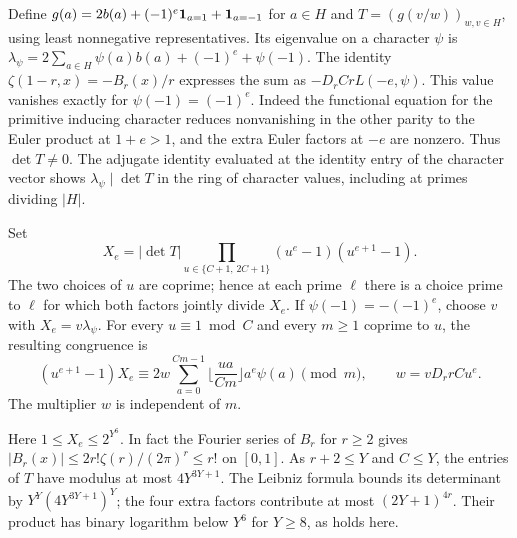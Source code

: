 Define $g(a)=2b(a)+(-1)^e{\bf1}_{a=1}+{\bf1}_{a=-1}$ for $a\in H$
and $T=(g(v/w))_{w,v\in H}$, using least nonnegative representatives.
Its eigenvalue on a character $\psi$ is
$\lambda_\psi=2\sum_{a\in H}\psi(a)b(a)+(-1)^e+\psi(-1)$.
The identity $\zeta(1-r,x)=-B_r(x)/r$ expresses the sum as
$-D_r C r L(-e,\psi)$. This value vanishes exactly for
$\psi(-1)=(-1)^e$. Indeed the functional equation for the primitive
inducing character reduces nonvanishing in the other parity to the
Euler product at $1+e>1$, and the extra Euler factors at $-e$ are nonzero.
Thus $\det T\ne0$. The adjugate identity evaluated at the identity
entry of the character vector shows $\lambda_\psi\mid\det T$ in the
ring of character values, including at primes dividing $|H|$.

Set
\[
 X_e=|\det T|\prod_{u\in\{C+1,\,2C+1\}}
              (u^e-1)(u^{e+1}-1).
\]
The two choices of $u$ are coprime; hence at each prime $\ell$ there
is a choice prime to $\ell$ for which both factors jointly divide $X_e$.
If $\psi(-1)=-(-1)^e$, choose $v$ with $X_e=v\lambda_\psi$.
For every $u\equiv1\bmod C$ and every $m\ge1$ coprime to $u$, the resulting congruence is
\[
 (u^{e+1}-1) X_e\equiv
 2w\sum_{a=0}^{Cm-1}\Big\lfloor\frac{ua}{Cm}\Big\rfloor a^e\psi(a)
 \pmod m,\qquad w=vD_r r C u^e .
\]
The multiplier $w$ is independent of $m$.

Here $1\le X_e\le 2^{Y^6}$. In fact the Fourier series of $B_r$ for
$r\ge2$ gives $|B_r(x)|\le 2r!\zeta(r)/(2\pi)^r\le r!$ on $[0,1]$.
As $r+2\le Y$ and $C\le Y$, the entries of $T$ have modulus at most
$4Y^{3Y+1}$. The Leibniz formula bounds its determinant by
$Y^Y(4Y^{3Y+1})^Y$; the four extra factors contribute at most
$(2Y+1)^{4r}$. Their product has binary logarithm below $Y^6$
for $Y\ge 8$, as holds here.

